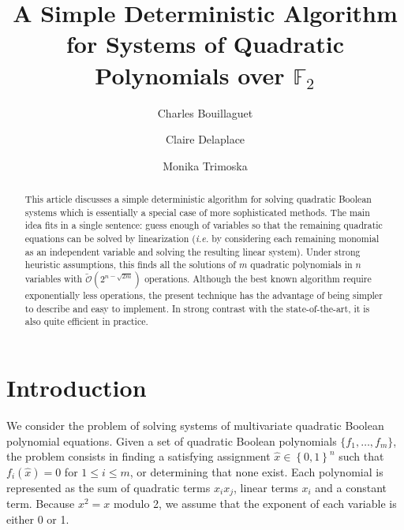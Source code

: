 \documentclass[a4paper,UKenglish,cleveref, autoref]{lipics-v2019}
\title{A Simple Deterministic Algorithm for Systems of Quadratic Polynomials over $\mathbb{F}_2$}
\author{Charles Bouillaguet}{LIP6 laboratory, Sorbonne Université, Paris, France}{charles.bouillaguet@lip6.fr}{https://orcid.org/0000-0001-9416-6244}{}
\author{Claire Delaplace}{MIS Laboratory, Université de Picardie Jules Verne, Amiens, France}{claire.delaplace@u-picardie.fr}{https://orcid.org/0000-0002-5314-1806}{}
\author{Monika Trimoska}{MIS Laboratory, Université de Picardie Jules Verne, Amiens, France}{monika.trimoska@u-picardie.fr}{https://orcid.org/0000-0002-1477-0001}{}
\newcommand{\bits}{\left\{0, 1\right\}}
\newcommand{\bigOsoft}[1]{\ensuremath{\mathcal{\tilde O}\left( #1 \right)} }
\begin{document}
\maketitle

\begin{abstract}
  This article discusses a simple deterministic algorithm for solving quadratic
  Boolean systems which is essentially a special case of more sophisticated
  methods. The main idea fits in a single sentence: guess enough of variables so
  that the remaining quadratic equations can be solved by linearization
  (\textit{i.e.} by considering each remaining monomial as an independent
  variable and solving the resulting linear system). Under strong heuristic
  assumptions, this finds all the solutions of $m$ quadratic polynomials in $n$
  variables with $\bigOsoft{2^{n-\sqrt{2m}}}$ operations. Although the best
  known algorithm require exponentially less operations, the present technique
  has the advantage of being simpler to describe and easy to implement. In
  strong contrast with the state-of-the-art, it is also quite efficient in
  practice.
\end{abstract}


\clearpage

\section{Introduction}

We consider the problem of solving systems of multivariate quadratic Boolean
polynomial equations. Given a set of quadratic Boolean polynomials
$\{f_1, \dots, f_m\}$, the problem consists in finding a satisfying assignment
$\hat x \in \bits^n$ such that $f_i(\hat x) = 0$ for $1 \leq i \leq m$, or
determining that none exist. Each polynomial is represented as the sum of
quadratic terms $x_i x_j$, linear terms $x_i$ and a constant term. Because
$x^2 = x$ modulo 2, we assume that the exponent of each variable is either 0 or
1.


\end{document}
